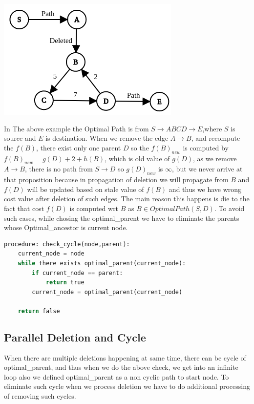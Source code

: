 \documentclass[a4paper]{article}
\begin{document}
\begin{center}
\includegraphics[scale=0.45]{img/cycle.png}        
\end{center}
In The above example the Optimal Path is from $S \rightarrow ABCD \rightarrow E$,where $S$ is source and $E$ is destination. When we remove the edge $A \rightarrow B$, and recompute the $f(B)$, there exist only one parent $D$ so the $f(B)_{new}$ is computed by $f(B)_{new} = g(D) + 2 + h(B)$, which is old value of $g(D)$, as we remove $A \rightarrow B$, there is no path from $S \rightarrow D$ so $g(D)_{new}$ is $\infty$, but we never arrive at that proposition because in propagation of deletion we will propagate from $B$  and $f(D)$ will be updated based on stale value of $f(B)$ and thus we have wrong cost value after deletion of such edges. The main reason this happens is die to the fact that cost $f(D)$ is computed wrt $B$ as $B \in OptimalPath(S,D)$. To avoid such cases, while chosing the optimal\_parent we have to eliminate the parents whose Optimal\_ancestor is current node.\\
\begin{lstlisting}[language=python, caption=Check Cycles]
procedure: check_cycle(node,parent):
    current_node = node
    while there exists optimal_parent(current_node):
        if current_node == parent:
            return true
        current_node = optimal_parent(current_node)
    
    return false
\end{lstlisting}

\subsection{Parallel Deletion and Cycle}
When there are multiple deletions happening at same time, there can be cycle of optimal\_parent, and thus when we do the above check, we get into an infinite loop also we defined optimal\_parent as a non cyclic path to start node. To eliminate such cycle when we process deletion we have to do additional processing of removing such cycles.\\
\end{document}
